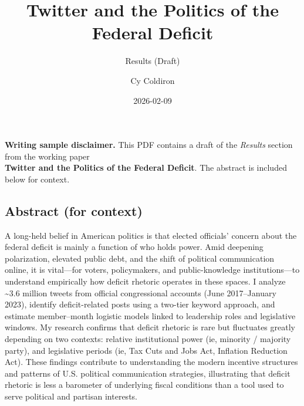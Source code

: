 \documentclass[
]{article}
\title{Twitter and the Politics of the Federal Deficit}
\subtitle{Results (Draft)}
\author{Cy Coldiron}
\date{2026-02-09}
\renewcommand*\contentsname{Table of contents}
\newcommand\contentsname{Table of contents}
\begin{document}
\maketitle

\renewcommand*\contentsname{Table of contents}
{
\hypersetup{linkcolor=}
\setcounter{tocdepth}{3}
\tableofcontents
}

\begin{tcolorbox}[enhanced jigsaw, toprule=.15mm, breakable, title=\textcolor{quarto-callout-important-color}{\faExclamation}\hspace{0.5em}{Important}, coltitle=black, opacityback=0, leftrule=.75mm, colback=white, opacitybacktitle=0.6, colbacktitle=quarto-callout-important-color!10!white, left=2mm, colframe=quarto-callout-important-color-frame, bottomtitle=1mm, toptitle=1mm, arc=.35mm, titlerule=0mm, rightrule=.15mm, bottomrule=.15mm]

\textbf{Writing sample disclaimer.} This PDF contains a draft of the
\emph{Results} section from the working paper\\
\textbf{Twitter and the Politics of the Federal Deficit}. The abstract
is included below for context.

\end{tcolorbox}

\subsection{Abstract (for context)}\label{abstract-for-context}

A long-held belief in American politics is that elected officials'
concern about the federal deficit is mainly a function of who holds
power. Amid deepening polarization, elevated public debt, and the shift
of political communication online, it is vital---for voters,
policymakers, and public-knowledge institutions---to understand
empirically how deficit rhetoric operates in these spaces. I analyze
\textasciitilde3.6 million tweets from official congressional accounts
(June 2017--January 2023), identify deficit-related posts using a
two-tier keyword approach, and estimate member--month logistic models
linked to leadership roles and legislative windows. My research confirms
that deficit rhetoric is rare but fluctuates greatly depending on two
contexts: relative institutional power (ie, minority / majority party),
and legislative periods (ie, Tax Cuts and Jobs Act, Inflation Reduction
Act). These findings contribute to understanding the modern incentive
structures and patterns of U.S. political communication strategies,
illustrating that deficit rhetoric is less a barometer of underlying
fiscal conditions than a tool used to serve political and partisan
interests.
\end{document}
